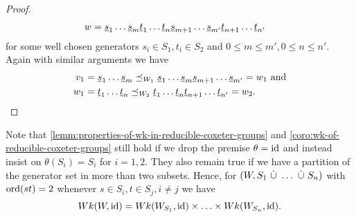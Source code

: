 \begin{coro}
\begin{proof}
\begin{align*}
			w	& = \underline{s}_1 \ldots \underline{s}_m \underline{t}_1 \ldots \underline{t}_n \underline{s}_{m+1} \ldots \underline{s}_{m'} \underline{t}_{n+1} \ldots \underline{t}_{n'}
		\end{align*}
		for some well chosen generators $s_i \in S_1, t_i \in S_2$ and $0 \leq m \leq m', 0 \leq n \leq n'$. Again with similar arguments we have 
		\begin{align*}
			v_1	& = \underline{s}_1 \ldots \underline{s}_m \preceq_{W_1} \underline{s}_1 \ldots \underline{s}_m \underline{s}_{m+1} \ldots \underline{s}_{m'} = w_1 \textrm{ and} \\
			w_1	& = \underline{t}_1 \ldots \underline{t}_n \preceq_{W_2} \underline{t}_1 \ldots \underline{t}_n \underline{t}_{n+1} \ldots \underline{t}_{n'} = w_2. \qedhere
		\end{align*}
	\end{proof}
\end{coro}

\begin{rema}
	Note that \ref{lemm:properties-of-wk-in-reducible-coxeter-groups} and \ref{coro:wk-of-reducible-coxeter-groups} still hold if we drop the premise $\theta = \operatorname{id}$ and instead insist on $\theta(S_i) = S_i$ for $i=1,2$. They also remain true if we have a partition of the generator set in more than two subsets. Hence, for $(W,S_1 \ \dot \cup \  \ldots \ \dot \cup \  S_n)$ with $\operatorname{ord}(st) = 2$ whenever $s \in S_i, t \in S_j, i \neq j$ we have
	$$ Wk(W,\operatorname{id}) = Wk(W_{S_1},\operatorname{id}) \times \ldots \times Wk(W_{S_n},\operatorname{id}). $$
\end{rema}

